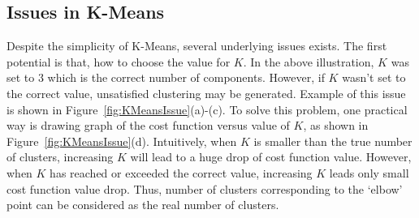 \subsection{Issues in K-Means}
\label{subsec:KMeansIssues}
Despite the simplicity of K-Means, several underlying issues exists. The first potential is that, how to choose the value for \(K\). In the above illustration, \(K\) was set to 3 which is the correct number of components. However, if \(K\) wasn't set to the correct value, unsatisfied clustering may be generated. Example of this issue is shown in Figure~\ref{fig:KMeansIssue}(a)-(c). To solve this problem, one practical way is drawing graph of the cost function versus value of \(K\), as shown in Figure~\ref{fig:KMeansIssue}(d). Intuitively, when \(K\) is smaller than the true number of clusters, increasing \(K\) will lead to a huge drop of cost function value. However, when \(K\) has reached or exceeded the correct value, increasing \(K\) leads only small cost function value drop. Thus, number of clusters corresponding to the `elbow' point can be considered as the real number of clusters.

